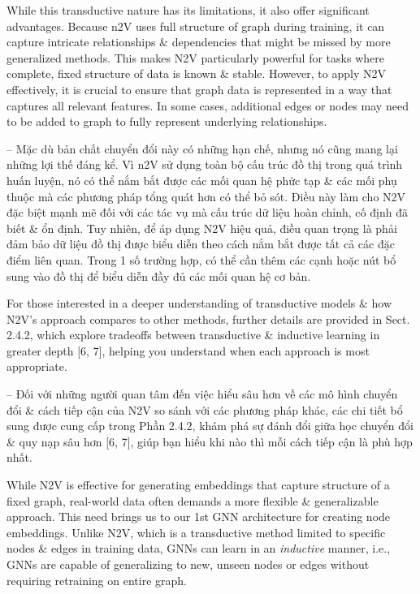 \documentclass{article}
\begin{document}
\begin{itemize}
\begin{itemize}
\begin{itemize}
           While this transductive nature has its limitations, it also offer significant advantages. Because n2V uses full structure of graph during training, it can capture intricate relationships \& dependencies that might be missed by more generalized methods. This makes N2V particularly powerful for tasks where complete, fixed structure of data is known \& stable. However, to apply N2V effectively, it is crucial to ensure that graph data is represented in a way that captures all relevant features. In some cases, additional edges or nodes may need to be added to graph to fully represent underlying relationships.

           -- Mặc dù bản chất chuyển đổi này có những hạn chế, nhưng nó cũng mang lại những lợi thế đáng kể. Vì n2V sử dụng toàn bộ cấu trúc đồ thị trong quá trình huấn luyện, nó có thể nắm bắt được các mối quan hệ phức tạp \& các mối phụ thuộc mà các phương pháp tổng quát hơn có thể bỏ sót. Điều này làm cho N2V đặc biệt mạnh mẽ đối với các tác vụ mà cấu trúc dữ liệu hoàn chỉnh, cố định đã biết \& ổn định. Tuy nhiên, để áp dụng N2V hiệu quả, điều quan trọng là phải đảm bảo dữ liệu đồ thị được biểu diễn theo cách nắm bắt được tất cả các đặc điểm liên quan. Trong 1 số trường hợp, có thể cần thêm các cạnh hoặc nút bổ sung vào đồ thị để biểu diễn đầy đủ các mối quan hệ cơ bản.

           For those interested in a deeper understanding of transductive models \& how N2V's approach compares to other methods, further details are provided in Sect. 2.4.2, which explore tradeoffs between transductive \& inductive learning in greater depth [6, 7], helping you understand when each approach is most appropriate.

           -- Đối với những người quan tâm đến việc hiểu sâu hơn về các mô hình chuyển đổi \& cách tiếp cận của N2V so sánh với các phương pháp khác, các chi tiết bổ sung được cung cấp trong Phần 2.4.2, khám phá sự đánh đổi giữa học chuyển đổi \& quy nạp sâu hơn [6, 7], giúp bạn hiểu khi nào thì mỗi cách tiếp cận là phù hợp nhất.

           While N2V is effective for generating embeddings that capture structure of a fixed graph, real-world data often demands a more flexible \& generalizable approach. This need brings us to our 1st GNN architecture for creating node embeddings. Unlike N2V, which is a transductive method limited to specific nodes \& edges in training data, GNNs can learn in an {\it inductive} manner, i.e., GNNs are capable of generalizing to new, unseen nodes or edges without requiring retraining on entire graph.


\end{itemize}
\end{itemize}
\end{itemize}
\end{document}
